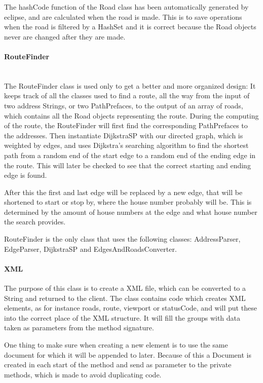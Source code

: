 \documentclass[a4paper,10pt,titlepage]{article}
\begin{document}
The hashCode function of the Road class has been automatically generated by eclipse, and are calculated when the road is made. This is to save operations when the road is filtered by a HashSet and it is correct because the Road objects never are changed after they are made.
				
				\paragraph{RouteFinder}\mbox{}\\
The RouteFinder class is used only to get a better and more organized design: It keeps track of all the classes used to find a route, all the way from the input of two address Strings, or two PathPrefaces, to the output of an array of roads, which contains all the Road objects representing the route. During the computing of the route, the RouteFinder will first find the corresponding PathPrefaces to the addresses. Then instantiate DijkstraSP with our directed graph, which is weighted by edges, and uses Dijkstra’s searching algorithm to find the shortest path from a random end of the start edge to a random end of the ending edge in the route. This will later be checked to see that the correct starting and ending edge is found.

After this the first and last edge will be replaced by a new edge, that will be shortened to start or stop by, where the house number probably will be. This is determined by the amount of house numbers at the edge and what house number the search provides.

RouteFinder is the only class that uses the following classes: AddressParser,  EdgeParser, DijkstraSP and EdgesAndRoadsConverter.



				
				\paragraph{XML}\mbox{}
				
The purpose of this class is to create a XML file, which can be converted to a String and returned to the client. The class contains code which creates XML elements, as for instance roads, route, viewport or statusCode, and will put these into the correct place of the XML structure. It will fill the groups with data taken as parameters from the method signature. 

One thing to make sure when creating a new element is to use the same document for which it will be appended to later. Because of this a Document is created in each start of the method and send as parameter to the private methods, which is made to avoid duplicating code.
\end{document}
